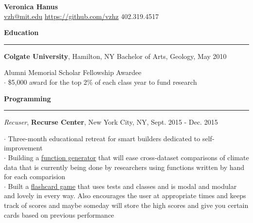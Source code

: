 \documentclass[11pt]{article}
\begin{document}
\bigskip
\begin{flushleft}
\LARGE{\textbf{Veronica Hanus}}\\
\large{\href{mailto:vzh@mit.edu}{vzh@mit.edu}} \hspace*{0.002in} \normalsize{\url{https://github.com/vzhz}} \hspace*{0.002in} \normalsize{402.319.4517}\\
\end{flushleft}
\smallskip

\vspace*{0.25 mm}
\textbf{Education}
\smallskip
\hrule 
\textbf{Colgate University}, Hamilton, NY\hspace*{2.2 in} 	Bachelor of Arts, Geology, May 2010\\	
\begin{small}Alumni Memorial Scholar Fellowship Awardee\\
	$\cdot$ {\$5,000 award for the top 2\% of each class year to fund research}\end{small}

\vspace*{0.25 mm}
\textbf{Programming}
\smallskip
\hrule
\emph{Recuser}, \textbf {Recurse Center}, New York City, NY, Sept. 2015 - Dec. 2015 \\ 
\begin{small}$\cdot$ {Three-month educational retreat for smart builders dedicated to self-improvement}\\ 
$\cdot$ {Building a \href{https://github.com/vzhz/function_generator/blob/master/README.md}{function generator} that will ease cross-dataset comparisons of climate data that is currently being done by researchers using functions written by hand for each comparision}\\
$\cdot$ {Built a \href{https://github.com/vzhz/geography_guessing_game/blob/master/README.md}{flashcard game} that uses tests and classes and is modal and modular and lovely in every way. Also encourages the user at appropriate times and keeps track of scores and maybe someday will store the high scores and give you certain cards based on previous performance}\end{small} 
\end{document}
